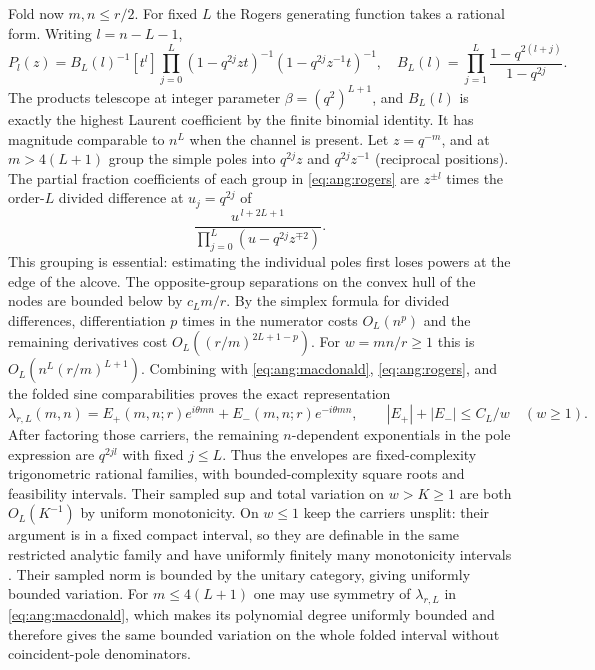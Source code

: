 Fold now \(m,n\leq r/2\). For fixed \(L\) the Rogers generating function \cite{IsmailStanton1988} takes a rational form. Writing \(l=n-L-1\),
\begin{equation}
 \label{eq:ang:rogers}
 P_l(z)= B_L(l)^{-1}[t^l]\prod_{j=0}^{L}
                  (1-q^{2j}zt)^{-1}(1-q^{2j}z^{-1}t)^{-1},
 \quad B_L(l)=\prod_{j=1}^{L}
                   \frac{1-q^{2(l+j)}}{1-q^{2j}} .
\end{equation}
The products telescope at integer parameter \(\beta=(q^2)^{L+1}\), and \(B_L(l)\) is exactly the highest Laurent coefficient by the finite binomial identity. It has magnitude comparable to \(n^L\) when the channel is present. Let \(z=q^{-m}\), and at \(m>4(L+1)\) group the simple poles into \(q^{2j}z\) and \(q^{2j}z^{-1}\) (reciprocal positions). The partial fraction coefficients of each group in \eqref{eq:ang:rogers} are \(z^{\pm l}\) times the order-\(L\) divided difference at \(u_j=q^{2j}\) of
\[
            \frac{u^{\,l+2L+1}}
                      {\prod_{j=0}^{L}(u-q^{2j}z^{\mp2})}.
\]
This grouping is essential: estimating the individual poles first loses powers at the edge of the alcove. The opposite-group separations on the convex hull of the nodes are bounded below by \(c_Lm/r\). By the simplex formula for divided differences, differentiation \(p\) times in the numerator costs \(O_L(n^p)\) and the remaining derivatives cost \(O_L((r/m)^{2L+1-p})\). For \(w=mn/r\geq1\) this is \(O_L(n^L(r/m)^{L+1})\). Combining with \eqref{eq:ang:macdonald}, \eqref{eq:ang:rogers}, and the folded sine comparabilities proves the exact representation
\begin{equation}
 \label{eq:ang:carriers}
 \lambda_{r,L}(m,n)=E_+(m,n;r)e^{i\theta mn}
                         +E_-(m,n;r)e^{-i\theta mn},
                 \qquad |E_+|+|E_-|\leq C_L/w\quad(w\geq1).
\end{equation}
After factoring those carriers, the remaining \(n\)-dependent exponentials in the pole expression are \(q^{2jl}\) with fixed \(j\leq L\). Thus the envelopes are fixed-complexity trigonometric rational families, with bounded-complexity square roots and feasibility intervals. Their sampled sup and total variation on \(w>K\geq1\) are both \(O_L(K^{-1})\) by uniform monotonicity. On \(w\leq1\) keep the carriers unsplit: their argument is in a fixed compact interval, so they are definable in the same restricted analytic family and have uniformly finitely many monotonicity intervals \cite{vdDMiller1996}. Their sampled norm is bounded by the unitary category, giving uniformly bounded variation. For \(m\leq4(L+1)\) one may use symmetry of \(\lambda_{r,L}\) in \eqref{eq:ang:macdonald}, which makes its polynomial degree uniformly bounded and therefore gives the same bounded variation on the whole folded interval without coincident-pole denominators.

